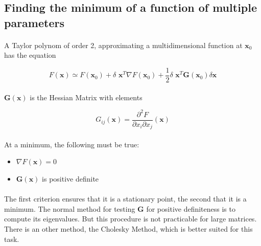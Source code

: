 \documentclass[a4paper,10pt]{thesis}
\begin{document}
\subsection{Finding the minimum of a function of multiple parameters}
\paragraph*{}
A Taylor polynom of order 2, approximating a multidimensional function at $\textbf{x}_0$ has the equation

\begin{equation}
F(\textbf{x} )\simeq F( \textbf{x}_0) + \delta \textbf{ x}^T \nabla F( \textbf{x}_0 )  + \frac{1}{2}  \delta \textbf{ x}^T \textbf{G}( \textbf{x}_0 ) \delta \textbf{x}
\end{equation}

\paragraph*{}
$\textbf{G}( \textbf{x} )$ is the Hessian Matrix with elements

\begin{equation}
G_{ij}(\textbf{x} )=\frac{\partial^2 F}{\partial x_i \partial x_j}(\textbf{x})
\end{equation}

\paragraph*{}
At a minimum, the following must be true:

\begin{itemize}
\item  $\nabla F( \textbf{x} )=0$
\item  $\textbf{G}( \textbf{x} )$ is positive definite
\end{itemize}

\paragraph*{}
The first criterion ensures that it is a stationary point, the second that it is a minimum. The normal method for testing \textbf{G} for positive definiteness is to compute its eigenvalues. But this procedure is not practicable for large matrices. There is an other method, the Cholesky Method, which is better suited for this task.

\paragraph*{}
\end{document}
